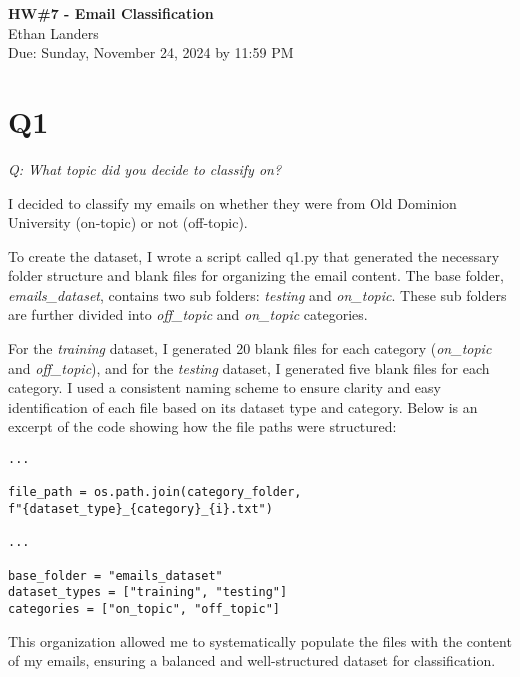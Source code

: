 \documentclass[12pt]{article}
\begin{document}
\begin{centering}
{\large\textbf{HW\#7 - Email Classification}}\\ 
Ethan Landers\\
Due: Sunday, November 24, 2024 by 11:59 PM\\
\end{centering}


\section*{Q1}

\emph{Q: What topic did you decide to classify on?}

I decided to classify my emails on whether they were from Old Dominion University (on-topic) or not (off-topic).

To create the dataset, I wrote a script called q1.py that generated the necessary folder structure and blank files for organizing the email content. The base folder, \emph{emails\_dataset}, contains two sub folders: \emph{testing} and \emph{on\_topic}. These sub folders are further divided into \emph{off\_topic} and \emph{on\_topic} categories.

For the \emph{training} dataset, I generated 20 blank files for each category (\emph{on\_topic} and \emph{off\_topic}), and for the \emph{testing} dataset, I generated five blank files for each category. I used a consistent naming scheme to ensure clarity and easy identification of each file based on its dataset type and category. Below is an excerpt of the code showing how the file paths were structured:

\begin{verbatim}
...

file_path = os.path.join(category_folder, 
f"{dataset_type}_{category}_{i}.txt")

...

base_folder = "emails_dataset"
dataset_types = ["training", "testing"]
categories = ["on_topic", "off_topic"]

\end{verbatim}

This organization allowed me to systematically populate the files with the content of my emails, ensuring a balanced and well-structured dataset for classification.
\end{document}
